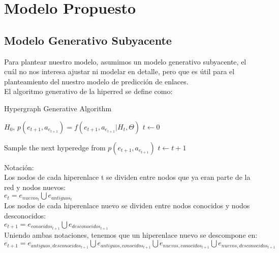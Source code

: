 \chapter{Modelo Propuesto}

\section{Modelo Generativo Subyacente}

Para plantear nuestro modelo, asumimos un modelo generativo subyacente, el cuál no nos interesa ajustar ni modelar en detalle, pero que es útil para el planteamiento del nuestro modelo de predicción de enlaces.\\

El algoritmo generativo de la hiperred se define como:

\begin{algorithm}
\caption{Hypergraph Generative Algorithm}\label{alg:cap}
\begin{algorithmic}
\Require $H_{0}$,  $p(e_{t+1}, a_{e_{t+1}}) = f(e_{t+1}, a_{e_{t+1}}|H_{t}, \Theta)$
\State $t \gets 0$

Sample the next hyperedge from $p(e_{t+1}, a_{e_{t+1}})$
\State $t \gets t+1$

\EndWhile
\end{algorithmic}
\end{algorithm}

Notación:\\

Los nodos de cada hiperenlace t se dividen entre nodos que ya eran parte de la red y nodos nuevos:\\

$e_t =  e_{nuevos_t} \bigcup e_{antiguos_t}$\\

Los nodos de cada hiperenlace nuevo se dividen entre nodos conocidos y nodos desconocidos:\\

$e_{t+1} = e_{conocidos_{t+1}} \bigcup e_{desconocidos_{t+1}}$\\

Uniendo ambas notaciones, tenemos que un hiperenlace nuevo se descompone en:\\

$e_{t+1} = e_{antiguos, desconocidos_{t+1}} \bigcup e_{antiguos, conocidos_{t+1}} \bigcup e_{nuevos, conocidos_{t+1}} \bigcup e_{nuevos, desconocidos_{t+1}}$\\

